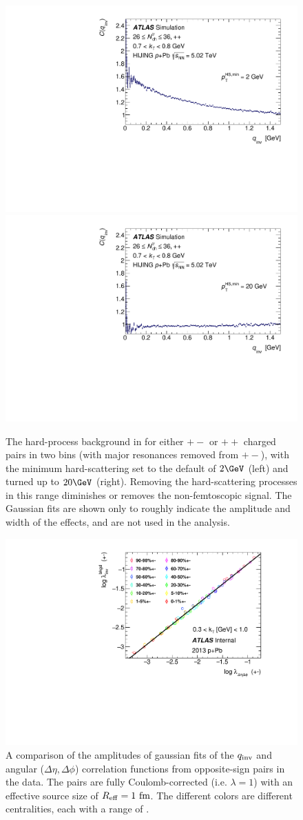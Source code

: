 \begin{figure}[t]
\begin{minipage}[t]{1.0\textwidth}
\includegraphics[width=.4\linewidth]{Cqinv_Nch26to36_e1_kt6_pPbHijing.pdf}
\includegraphics[width=.4\linewidth]{Cqinv_Nch26to36_e1_kt6_pPbHijing20.pdf}
\end{minipage}
\caption{The hard-process background in \Hijing for either $+-$ or $++$ charged pairs in two \kt bins (with major resonances removed from $+-$), with the minimum hard-scattering \pt set to the default of $2 \GeV$ (left) and turned up to $20 \GeV$ (right). Removing the hard-scattering processes in this range diminishes or removes the non-femtoscopic signal. The Gaussian fits are shown only to roughly indicate the amplitude and width of the effects, and are not used in the analysis.}
\label{fig:hard_process_min_pt}
\end{figure}

\begin{figure}[t]
\centering
\includegraphics{qinv_backLambda_vs_ang_backLambda.pdf}
\caption{A comparison of the amplitudes of gaussian fits of the $q_{\mathrm{inv}}$ and angular ($\Delta \eta, \Delta \phi$) correlation functions from opposite-sign pairs in the data. The pairs are fully Coulomb-corrected (i.e. $\lambda = 1$) with an effective source size of $R_{\mathrm{eff}} = 1 \textrm{ fm}$. The different colors are different centralities, each with a range of \kt.}
\label{fig:background_amp_inv_vs_ang_data}
\end{figure}

